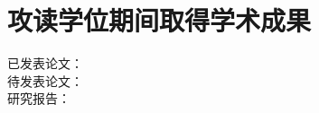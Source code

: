 \cleardoublepage{}
{}
\chapter*{攻读学位期间取得学术成果}
\song {}
\begin{description}
  \item[已发表论文：]
  \item[待发表论文：]  
  \item[研究报告：]  
\end{description}
